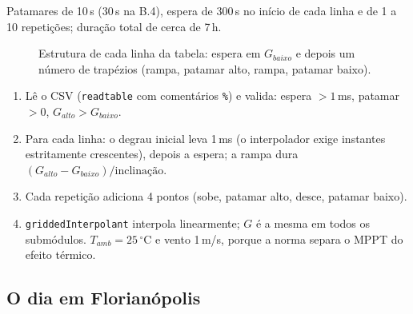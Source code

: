 Patamares de 10\,s (30\,s na B.4), espera de 300\,s no in\'icio de cada linha e de 1 a 10 repeti\c{c}\~oes; dura\c{c}\~ao total de cerca de 7\,h.

\begin{figure}[htbp]
\centering
{}
\caption{Estrutura de cada linha da tabela: espera em $G_{baixo}$ e depois um n\'umero de trap\'ezios (rampa, patamar alto, rampa, patamar baixo).}
\label{fig:trapezio}
\end{figure}


\begin{logica}
\begin{enumerate}
\item L\^e o CSV (\texttt{readtable} com coment\'arios \texttt{\%}) e valida: espera $>1$\,ms, patamar $>0$, $G_{alto}>G_{baixo}$.
\item Para cada linha: o degrau inicial leva 1\,ms (o interpolador exige instantes estritamente crescentes), depois a espera; a rampa dura $(G_{alto}-G_{baixo})/\text{inclina\c{c}\~ao}$.
\item Cada repeti\c{c}\~ao adiciona 4 pontos (sobe, patamar alto, desce, patamar baixo).
\item \texttt{griddedInterpolant} interpola linearmente; $G$ \'e a mesma em todos os subm\'odulos. $T_{amb}=25\,^\circ$C e vento 1\,m/s, porque a norma separa o MPPT do efeito t\'ermico.
\end{enumerate}
\end{logica}

\subsection{O dia em Florian\'opolis}

